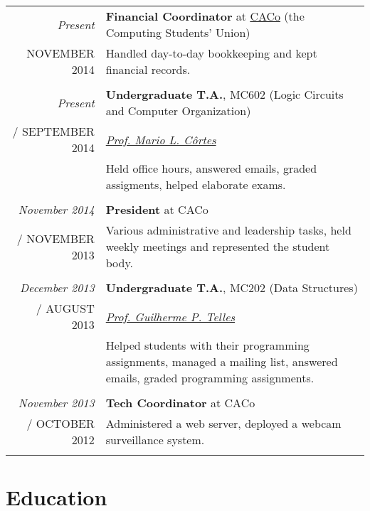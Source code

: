 \documentclass[a4paper,10pt]{article}
\makeatletter
\def\fakesc#1{%
  \begingroup%
  \xdef\fake@name{\csname\curr@fontshape/\f@size\endcsname}%
  \fontsize{\fontdimen8\fake@name}{\baselineskip}\selectfont%
  \uppercase{#1}%
  \endgroup%
}
\renewcommand{\textsc}{\fakesc}
\makeatother
\begin{document}
\begin{tabular}{r|p{11cm}}

  \emph{Present} & \textbf{Financial Coordinator} at \href{http://www.caco.ic.unicamp.br}{CACo} (the Computing Students' Union) \\
  \textsc{November 2014} & \footnotesize{Handled day-to-day bookkeeping and kept financial records.}\\
  \multicolumn{2}{c}{} \\

  \emph{Present} & \textbf{Undergraduate T.A.}, MC602 (Logic Circuits and Computer Organization)\\
  \textsc{September 2014} &  \href{http://www.ic.unicamp.br/~cortes/}{\emph{Prof. Mario L. Côrtes}}\\
                 & \footnotesize {Held office hours, answered emails, graded assigments, helped elaborate exams.}\\
  \multicolumn{2}{c}{}\\

  \emph{November 2014} & \textbf{President} at CACo \\
  \textsc{November 2013} & \footnotesize{Various administrative and leadership tasks, held weekly meetings and represented the student body. }\\
  \multicolumn{2}{c}{} \\

  \emph{December 2013} & \textbf{Undergraduate T.A.},  MC202 (Data Structures)\\
  \textsc{August 2013} &  \href{http://ic.unicamp.br/~gpt/}{\emph{Prof. Guilherme P. Telles}}\\
                 & \footnotesize {Helped students with their programming assignments, managed a mailing list, answered emails, graded programming assignments.}\\
  \multicolumn{2}{c}{}\\

  \emph{November 2013} & \textbf{Tech Coordinator} at CACo \\
  \textsc{October 2012} & \footnotesize{Administered a web server, deployed a webcam surveillance system.}\\
  \multicolumn{2}{c}{} \\


\end{tabular}

\section{Education}
\end{document}
